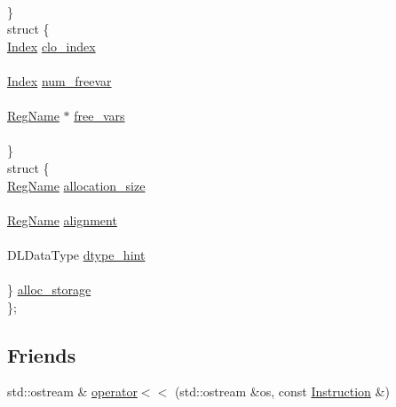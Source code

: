 \begin{DoxyCompactItemize}
\begin{tabbing}
\>\>\\
\>\} \\
\>struct \{\\
\>\>\hyperlink{namespacetvm_1_1runtime_1_1vm_a3597867d2db714bf760876a23d6b7d3d}{Index} \hyperlink{structtvm_1_1runtime_1_1vm_1_1Instruction_aaea1385d3562231a2e242faa0b51c616}{clo\_index}\\
\>\>\\
\>\>\hyperlink{namespacetvm_1_1runtime_1_1vm_a3597867d2db714bf760876a23d6b7d3d}{Index} \hyperlink{structtvm_1_1runtime_1_1vm_1_1Instruction_adbf563aa259f209ad20619c25921cdc1}{num\_freevar}\\
\>\>\\
\>\>\hyperlink{namespacetvm_1_1runtime_1_1vm_a3bbbf700719e9dc3dda2bc25210c18ae}{RegName} $\ast$ \hyperlink{structtvm_1_1runtime_1_1vm_1_1Instruction_a720b762553a301b526d66042afcd5ca3}{free\_vars}\\
\>\>\\
\>\} \\
\>struct \{\\
\>\>\hyperlink{namespacetvm_1_1runtime_1_1vm_a3bbbf700719e9dc3dda2bc25210c18ae}{RegName} \hyperlink{structtvm_1_1runtime_1_1vm_1_1Instruction_a4f907889caa7c348a3a2dea88e89b827}{allocation\_size}\\
\>\>\\
\>\>\hyperlink{namespacetvm_1_1runtime_1_1vm_a3bbbf700719e9dc3dda2bc25210c18ae}{RegName} \hyperlink{structtvm_1_1runtime_1_1vm_1_1Instruction_ad56f744402eb006b4b8ec94ccbe840c3}{alignment}\\
\>\>\\
\>\>DLDataType \hyperlink{structtvm_1_1runtime_1_1vm_1_1Instruction_a0f48c1e04fe9ba735576bef37caf9cce}{dtype\_hint}\\
\>\>\\
\>\} \hyperlink{structtvm_1_1runtime_1_1vm_1_1Instruction_af2ef1564cf59236e194d922633d90204}{alloc\_storage}\\
\}; \\

\end{tabbing}\end{DoxyCompactItemize}
\subsection*{Friends}
\begin{DoxyCompactItemize}
\item 
std\+::ostream \& \hyperlink{structtvm_1_1runtime_1_1vm_1_1Instruction_a7948440c8e6f670e3c782619415dc184}{operator$<$$<$} (std\+::ostream \&os, const \hyperlink{structtvm_1_1runtime_1_1vm_1_1Instruction}{Instruction} \&)
\end{DoxyCompactItemize}


